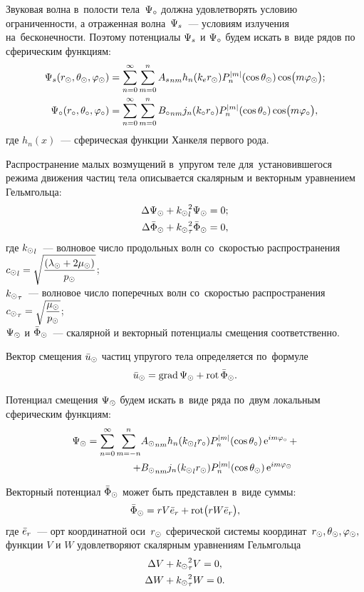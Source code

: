 Звуковая волна в~полости тела~$\P\c$ должна удовлетворять условию ограниченности, а отраженная волна~$\P\sc$~--- условиям излучения на~бесконечности. Поэтому потенциалы $\P\sc$ и $\P\c$ будем искать в~виде рядов по сферическим функциям:
\begin{align}\P\sc(r\s, \Q\s, \f\s) &= \sum\limits_{n = 0}^\infty \sum\limits_{m = 0}^n {A\sc}_{nm} h_n(k\en r\s) P_n^{\lvert m\rvert}(\cos\Q\s)\cos\bigl(m\f\s\bigr);\label{eq_psc}\\
\P\c(r\c, \Q\c, \f\c) &= \sum\limits_{n = 0}^\infty \sum\limits_{m = 0}^n {B\c}_{nm} j_n(k\c r\c) P_n^{\lvert m\rvert}(\cos\Q\c)\cos\bigl(m\f\c\bigr),\label{eq_pc}
\end{align}
где $h_n(x)$~--- сферическая функции Ханкеля первого рода.

Распространение малых возмущений в~упругом теле для~установившегося режима движения частиц тела описывается скалярным и векторным уравнением Гельмгольца:
\begin{align}
\Lap\P\s &+ {k\s}_l^2\P\s = 0;\label{Helmholtz_scalar}\\
\Lap\F\s &+ {k\s}_\t^2\F\s = 0,\label{Helmholtz_vector}
\end{align}
где ${k\s}_l$~--- волновое число продольных волн со~скоростью распространения \break 
${c\s}_l = \sqrt{\df{(\la\s + 2\mu\s)}{p\s}}$;\\
${k\s}_\t$~--- волновое число поперечных волн со~скоростью распространения \\
${c\s}_\t = \sqrt{\df{\mu\s}{p\s}}$;\\
$\P\s$ и $\F\s$~--- скалярной и векторный потенциалы смещения соответственно.

Вектор смещения $\u\s$ частиц упругого тела определяется по~формуле
$$
\u\s = \grad \P\s + \rot \F\s.
$$

Потенциал смещения $\P\s$ будем искать в~виде ряда по~двум локальным сферическим функциям:
\begin{equation}\label{eq_ps}
\begin{split}
\P\s = \sum\limits_{n=0}^\infty \sum\limits_{m=-n}^n 
  &{A\s}_{nm} h_n({k\s}_lr\c)P_n^{\lvert m\rvert}(\cos\Q\c)\e^{im\f\c} +\\
+ &{B\s}_{nm} j_n({k\s}_lr\s)P_n^{\lvert m\rvert}(\cos\Q\s)\e^{im\f\s}
\end{split}
\end{equation}

Векторный потенциал $\F\s$ может быть представлен в~виде суммы:
$$
\F\s = rV\er + \rot\bigl(rW\er\bigr),
$$
где $\er$~--- орт координатной оси~$r\s$ сферической системы координат~$r\s, \Q\s, \f\s,$\\
функции $V$ и $W$ удовлетворяют скалярным уравнениям Гельмгольца
\begin{align}
\Lap V &+ {k\s}_\t^2 V = 0,\\
\Lap W &+ {k\s}_\t^2 W = 0.
\end{align}

